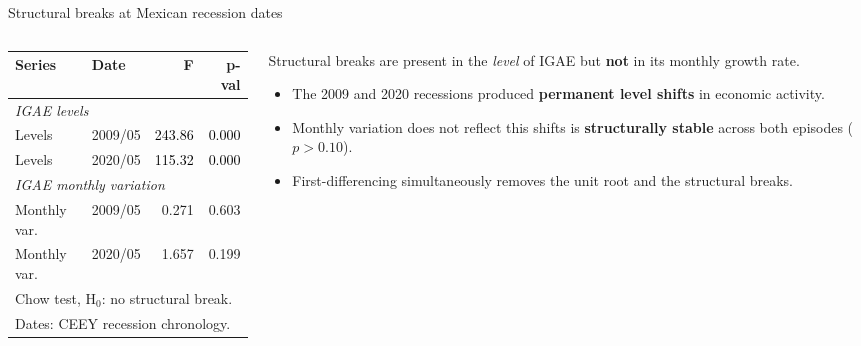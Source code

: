\documentclass[handout,aspectratio=169,11pt,xcolor={dvipsnames},hyperref={pdftex,pdfpagemode=UseNone,hidelinks,pdfdisplaydoctitle=true},usepdftitle=false]{beamer}
\begin{document}
\begin{frame}{Structural breaks at Mexican recession dates}

\begin{columns}[T]

\begin{column}{0.45\textwidth}
\small
\begin{tabular}{llrr}
\hline
\textbf{Series} & \textbf{Date} & \textbf{F} & \textbf{p-val} \\
\hline
\multicolumn{4}{l}{\textit{IGAE levels}} \\
\hline
Levels & 2009/05 & \textcolor{black}{243.86} & \textcolor{black}{0.000} \\
Levels & 2020/05 & \textcolor{black}{115.32} & \textcolor{black}{0.000} \\
\hline
\multicolumn{4}{l}{\textit{IGAE monthly variation}} \\
\hline
Monthly var. & 2009/05 & 0.271 & 0.603 \\
Monthly var. & 2020/05 & 1.657 & 0.199 \\
\hline
\multicolumn{4}{l}{\footnotesize Chow test, H$_0$: no structural break.} \\
\multicolumn{4}{l}{\footnotesize Dates: CEEY recession chronology.} \\
\end{tabular}
\end{column}

\begin{column}{0.52\textwidth}
Structural breaks are present in the \textit{level} of IGAE but \textbf{not} in its monthly growth rate.

\vspace{3mm}

\begin{itemize}
\item The 2009 and 2020 recessions produced \textbf{permanent level shifts} in economic activity.

\vspace{2mm}

\item Monthly variation does not reflect this shifts is \textbf{structurally stable} across both episodes ($p > 0.10$).

\vspace{2mm}

\item First-differencing simultaneously removes the unit root and the structural breaks.


\end{itemize}
\end{column}

\end{columns}
\end{frame}
\end{document}
